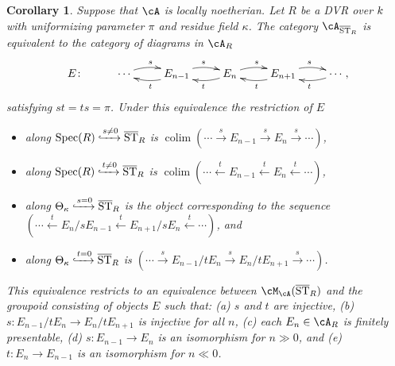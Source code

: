 \documentclass[a4paper]{amsart}
\numberwithin{equation}{section}
\theoremstyle{plain}
\newtheorem{cor}[thm]{Corollary}
\theoremstyle{definition}
\DeclareMathOperator{\Spec}{Spec}
\DeclareMathOperator{\ST}{ST}
\DeclareMathOperator{\colim}{colim}
\newcommand{\co}{\colon}
\def\oST{\overline{\ST}}
\begin{document}
\begin{cor} \label{C:reese}  Suppose that $\cA$ is locally noetherian.  Let $R$ be a DVR over $k$ with uniformizing parameter $\pi$ and residue field $\kappa$.
	The category $\cA_{\oST_R}$ is equivalent to the category of diagrams in $\cA_R$
	\begin{equation} \label{E:abelian_str}
	\xymatrix{E \co & \cdots \ar@{}|-{}[r] \ar@/^/[r]^s & E_{n-1} \ar@{}|-{}[r] \ar@/^/[r]^s \ar@/^/[l]^t & E_{n} \ar@{}|-{}[r] \ar@/^/[r]^s \ar@/^/[l]^t & E_{n+1}  \ar@/^/[r]^s \ar@/^/[l]^t \ar@{}|-{}[r] & \ar@/^/[l]^t \cdots },
	\end{equation}
	satisfying $st=ts=\pi$. Under this equivalence the restriction of $E$
	\begin{itemize}
		\item along $\Spec(R) \xhookrightarrow{s \neq 0} \oST_R$ is
		$\colim (\cdots \xrightarrow{s} E_{n-1} \xrightarrow{s} E_{n} \xrightarrow{s} \cdots)$,
		\item along $\Spec(R) \xhookrightarrow{t \neq 0} \oST_R$ is
		$\colim (\cdots \xleftarrow{t} E_{n-1} \xleftarrow{t} E_{n} \xleftarrow{t} \cdots)$,
		\item along $\Theta_{\kappa} \xhookrightarrow{s = 0} \oST_R$ is the object corresponding to the sequence $(\cdots \xleftarrow{t} E_n/sE_{n-1} \xleftarrow{t} E_{n+1}/sE_n \xleftarrow{t} \cdots)$, and
		\item along $\Theta_{\kappa} \xhookrightarrow{t = 0} \oST_R$ is $(\cdots \xrightarrow{s} E_{n-1}/tE_{n} \xrightarrow{s} E_{n}/tE_{n+1} \xrightarrow{s} \cdots)$.
	\end{itemize}
	This equivalence restricts to an equivalence between $\cM_{\cA}(\oST_R)$ and the groupoid consisting of objects $E$ such that:  (a) $s$ and $t$ are injective, (b) $s \co E_{n-1}/tE_n \to E_{n}/t E_{n+1}$ is injective for all $n$, (c) each $E_n \in \cA_R$ is finitely presentable, (d) $s \co E_{n-1} \to E_n$ is an isomorphism for $n \gg 0$, and (e) $t \co E_{n} \to E_{n-1}$ is an isomorphism for $n \ll 0$.
\end{cor}
\end{document}
